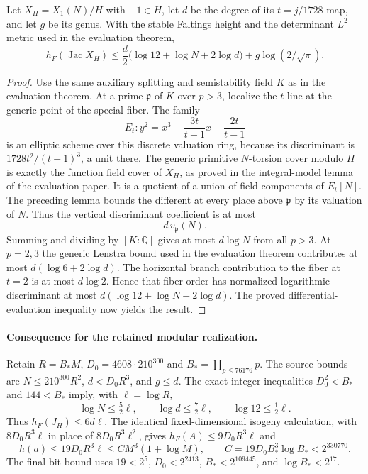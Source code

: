 \documentclass[11pt]{article}
\begin{document}
\begin{proposition}
Let $X_H=X_1(N)/H$ with $-1\in H$, let $d$ be the degree of its
$t=j/1728$ map, and let $g$ be its genus. With the stable Faltings
height and the determinant $L^2$ metric used in the evaluation theorem,
\[
 h_F(\operatorname{Jac}X_H)
 \le\frac d2\bigl(\log12+\log N+2\log d\bigr)
            +g\log(2/\sqrt\pi).
\]
\end{proposition}
\begin{proof}
Use the same auxiliary splitting and semistability field $K$ as in
the evaluation theorem. At a prime $\mathfrak p$ of $K$ over $p>3$,
localize the $t$-line at the generic point of the special fiber.
The family
\[
 E_t:y^2=x^3-\frac{3t}{t-1}x-\frac{2t}{t-1}
\]
is an elliptic scheme over this discrete valuation ring, because its
discriminant is $1728t^2/(t-1)^3$, a unit there. The generic primitive
$N$-torsion cover modulo $H$ is exactly the function field cover of
$X_H$, as proved in the integral-model lemma of the evaluation paper.
It is a quotient of a union of field components of $E_t[N]$.
The preceding lemma bounds the different at every place above
$\mathfrak p$ by its valuation of $N$. Thus the vertical discriminant
coefficient is at most
\[
            d\,v_{\mathfrak p}(N).
\]
Summing and dividing by $[K:\mathbb Q]$ gives at most $d\log N$
from all $p>3$. At $p=2,3$ the generic Lenstra bound used in the
evaluation theorem contributes at most
$d(\log6+2\log d)$. The horizontal branch contribution to the
fiber at $t=2$ is at most $d\log2$. Hence that fiber order has
normalized logarithmic discriminant at most
$d(\log12+\log N+2\log d)$. The proved differential-evaluation
inequality now yields the result.
\end{proof}

\paragraph{Consequence for the retained modular realization.}
Retain $R=B_*M$, $D_0=4608\cdot210^{300}$ and
$B_*=\prod_{p\le76176}p$. The source bounds are
$N\le210^{300}R^2$, $d<D_0R^3$, and $g\le d$.
The exact integer inequalities $D_0^2<B_*$ and $144<B_*$ imply,
with $\ell=\log R$,
\[
 \log N\le\tfrac52\ell,\qquad
 \log d\le\tfrac72\ell,\qquad
 \log12\le\tfrac12\ell.
\]
Thus $h_F(J_H)\le6d\ell$. The identical fixed-dimensional isogeny
calculation, with $8D_0R^3\ell$ in place of
$8D_0R^3\ell^2$, gives $h_F(A)\le9D_0R^3\ell$ and
\[
 h(a)\le19D_0R^3\ell
       \le C M^3(1+\log M),\qquad
 C=19D_0B_*^3\log B_*<2^{330770}.
\]
The final bit bound uses $19<2^5$, $D_0<2^{2413}$,
$B_*<2^{109445}$, and $\log B_*<2^{17}$.
\end{document}

